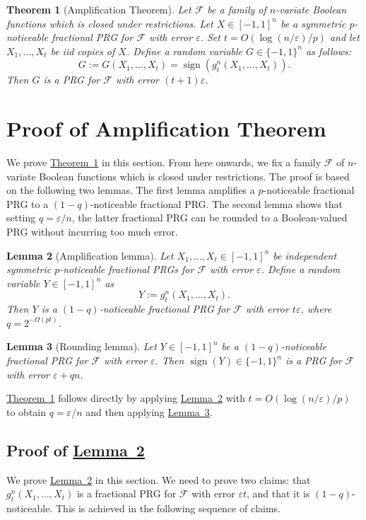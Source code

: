 \documentclass[11pt]{article}
\numberwithin{equation}{section}
\newtheorem{theorem}{Theorem}[section]
\newtheorem{lemma}[theorem]{Lemma}
\theoremstyle{definition}
\theoremstyle{plain}
\newcommand{\expref}[2]{\hyperref[#2]{#1~\ref{#2}}}
\newcommand{\FF}{\mathcal{F}}
\newcommand{\eps}{\varepsilon}
\DeclareMathOperator{\sign}{sign}     %
\begin{document}
\begin{theorem}[Amplification Theorem]
\label{thm:main}
Let $\FF$ be a family of $n$-variate Boolean functions which is closed under restrictions.
Let $X \in [-1,1]^n$ be a symmetric $p$-noticeable fractional PRG for $\FF$ with error $\eps$. Set $t=O(\log(n/\eps)/p)$ and let $X_1,\ldots,X_t$
be iid copies of $X$. Define a random variable $G \in \{-1,1\}^n$ as follows:
$$
G:=G(X_1,\ldots,X_t) = \sign(g_t^n(X_1,\ldots,X_t)).
$$
Then $G$ is a PRG for $\FF$ with error $(t+1)\eps$.
\end{theorem}


\section{Proof of Amplification Theorem}
\label{sec:proof_main}
We prove \expref{Theorem}{thm:main} in this section. {}From here onwards, we fix a family $\FF$ of $n$-variate Boolean functions which is closed under restrictions.
The proof is based on the following two lemmas.
The first lemma amplifies a $p$-noticeable fractional PRG to a $(1-q)$-noticeable fractional PRG\@. The second
lemma shows that setting $q=\eps/n$, the latter fractional PRG can be rounded to a Boolean-valued PRG without incurring
too much error.

\begin{lemma}[Amplification lemma]
\label{lemma:amplify}
Let $X_1,\ldots,X_t \in [-1,1]^n$ be independent symmetric $p$-noticeable fractional PRGs for $\FF$ with error $\eps$.
Define a random variable $Y \in [-1,1]^n$ as
$$
Y:=g_t^n(X_1,\ldots,X_t).
$$
Then $Y$ is a $(1-q)$-noticeable fractional PRG for $\FF$ with error $t\eps$, where $q=2^{-\Omega(pt)}$.
\end{lemma}

\begin{lemma}[Rounding lemma]
\label{lemma:round}
Let $Y \in [-1,1]^n$ be a $(1-q)$-noticeable fractional PRG for $\FF$ with error $\eps$.
Then $\sign(Y) \in \{-1,1\}^n$ is a PRG for $\FF$ with error $\eps+qn$.
\end{lemma}

\expref{Theorem}{thm:main} follows directly by applying \expref{Lemma}{lemma:amplify} with $t=O(\log(n/\eps)/p)$ to obtain
$q=\eps/n$ and then applying \expref{Lemma}{lemma:round}.

\subsection{Proof of \expref{Lemma}{lemma:amplify}}
We prove \expref{Lemma}{lemma:amplify} in this section. We need to prove two claims: that $g_t^n(X_1,\ldots,X_t)$ is a fractional
PRG for $\FF$ with error $\eps t$, and that it is $(1-q)$-noticeable. This is achieved in the following sequence of claims.
\end{document}
